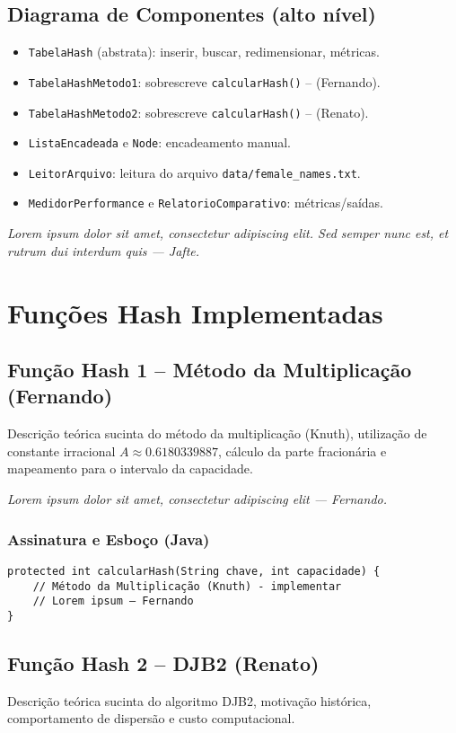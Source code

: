 \documentclass[12pt,a4paper]{abntex2}
\newcommand{\placeholderAluno}[1]{\textit{Lorem ipsum dolor sit amet, consectetur adipiscing elit — #1.}}
\newcommand{\placeholderAlunoLongo}[1]{\textit{Lorem ipsum dolor sit amet, consectetur adipiscing elit. Sed semper nunc est, et rutrum dui interdum quis — #1.}}
\begin{document}
\subsection{Diagrama de Componentes (alto nível)}
\begin{itemize}[noitemsep]
  \item \texttt{TabelaHash} (abstrata): inserir, buscar, redimensionar, métricas.
  \item \texttt{TabelaHashMetodo1}: sobrescreve \texttt{calcularHash()} -- (Fernando).
  \item \texttt{TabelaHashMetodo2}: sobrescreve \texttt{calcularHash()} -- (Renato).
  \item \texttt{ListaEncadeada} e \texttt{Node}: encadeamento manual.
  \item \texttt{LeitorArquivo}: leitura do arquivo \texttt{data/female\_names.txt}.
  \item \texttt{MedidorPerformance} e \texttt{RelatorioComparativo}: métricas/saídas.
\end{itemize}

\placeholderAlunoLongo{Jafte}

\section{Funções Hash Implementadas}

\subsection{Função Hash 1 -- Método da Multiplicação (Fernando)}
Descrição teórica sucinta do método da multiplicação (Knuth), utilização de constante irracional \(A \approx 0.6180339887\), cálculo da parte fracionária e mapeamento para o intervalo da capacidade.

\placeholderAluno{Fernando}

\subsubsection*{Assinatura e Esboço (Java)}
\begin{lstlisting}[style=console]
protected int calcularHash(String chave, int capacidade) {
    // Método da Multiplicação (Knuth) - implementar
    // Lorem ipsum — Fernando
}
\end{lstlisting}

\subsection{Função Hash 2 -- DJB2 (Renato)}
Descrição teórica sucinta do algoritmo DJB2, motivação histórica, comportamento de dispersão e custo computacional.
\end{document}
